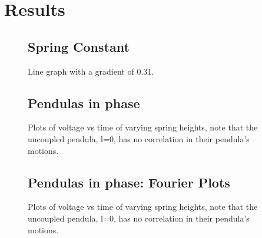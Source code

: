 \documentclass{article}
\begin{document}
\section{Results}
\begin{figure}
    \subsection{Spring Constant}
    \centering
    \scalebox{0.75}{}
    \caption{Line graph with a gradient of 0.31.}
    \label{fig:kgraph}
\end{figure}
\begin{figure}[p]
\subsection{Pendulas in phase}
    \centering
    \scalebox{0.52}{}
    \hspace{0.5cm}
    \scalebox{0.52}{}
  
    \vspace{0.5cm}
  
    \scalebox{0.52}{}
    \hspace{0.5cm}
    \scalebox{0.52}{}
  
    \vspace{0.5cm}
  
    \scalebox{0.52}{}
    \hspace{0.5cm}
    \scalebox{0.52}{}
  
    \caption{Plots of voltage vs time of varying spring heights, note 
    that the uncoupled pendula, l=0, has no correlation in their 
    pendula's motions.}
\end{figure}

\FloatBarrier

\begin{figure}[p]
\subsection{Pendulas in phase: Fourier Plots}
    \centering
    \scalebox{0.52}{}
    \hspace{0.5cm}
    \scalebox{0.52}{}
  
    \vspace{0.5cm}
  
    \scalebox{0.52}{}
    \hspace{0.5cm}
    \scalebox{0.52}{}
  
    \vspace{0.5cm}
  
    \scalebox{0.52}{}
    \hspace{0.5cm}
    \scalebox{0.52}{}
  
    \caption{Plots of voltage vs time of varying spring heights, note 
    that the uncoupled pendula, l=0, has no correlation in their 
    pendula's motions.}
\end{figure}
\end{document}
